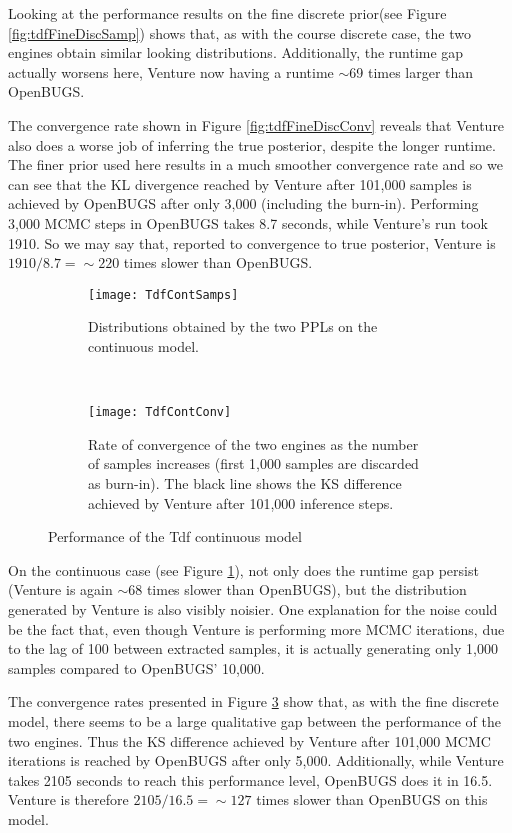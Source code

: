 Looking at the performance results on the fine discrete prior(see Figure \ref{fig:tdfFineDiscSamp}) shows that, as with the course discrete case, the two engines obtain similar looking distributions. Additionally, the runtime gap actually worsens here, Venture now having a runtime $\sim$69 times larger than OpenBUGS.

The convergence rate shown in Figure \ref{fig:tdfFineDiscConv} reveals that Venture also does a worse job of inferring the true posterior, despite the longer runtime. The finer prior used here results in a much smoother convergence rate and so we can see that the KL divergence reached by Venture after 101,000 samples is achieved by OpenBUGS after only 3,000 (including the burn-in). Performing 3,000 MCMC steps in OpenBUGS takes 8.7 seconds, while Venture's run took 1910. So we may say that, reported to convergence to true posterior, Venture is $1910/8.7 = \sim 220$ times slower than OpenBUGS.

\begin{figure}[h]
    \centering
    \begin{subfigure}[t]{0.48\textwidth}
      \texttt{[image: TdfContSamps]}
      \caption{Distributions obtained by the two PPLs on the continuous model.}
      \label{fig:tdfContSamp}
    \end{subfigure}
    ~
    \begin{subfigure}[t]{0.48\textwidth}
      \texttt{[image: TdfContConv]}
      \caption{Rate of convergence of the two engines as the number of samples increases (first 1,000 samples are discarded as burn-in). The black line shows the KS difference achieved by Venture after 101,000 inference steps.}
      \label{fig:tdfContConv}
    \end{subfigure}
    \caption{Performance of the Tdf continuous model}
\end{figure}

On the continuous case (see Figure \ref{fig:tdfContSamp}), not only does the runtime gap persist (Venture is again $\sim$68 times slower than OpenBUGS), but the distribution generated by Venture is also visibly noisier. One explanation for the noise could be the fact that, even though Venture is performing more MCMC iterations, due to the lag of 100 between extracted samples, it is actually generating only 1,000 samples compared to OpenBUGS' 10,000. 

The convergence rates presented in Figure \ref{fig:tdfContConv} show that, as with the fine discrete model, there seems to be a large qualitative gap between the performance of the two engines. Thus the KS difference achieved by Venture after 101,000 MCMC iterations is reached by OpenBUGS after only 5,000. Additionally, while Venture takes 2105 seconds to reach this performance level, OpenBUGS does it in 16.5. Venture is therefore $2105/16.5 = \sim 127$ times slower than OpenBUGS on this model.

